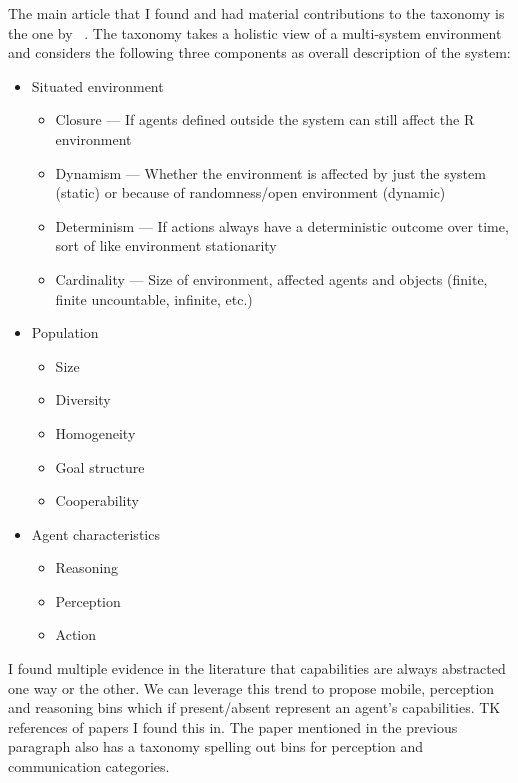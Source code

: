 \documentclass[letterpaper, 10 pt, conference]{ieeeconf} %
\theoremstyle{definition} \newtheorem{definition}{Definition}
\newcommand{\citet}[1]{\citeauthor{#1}~\cite{#1}}
\begin{document}
The main article that I found and had material contributions to the taxonomy is
the one by \citet{moya2007towards}. The taxonomy takes a holistic view of a
multi-system environment and considers the following three components as overall
description of the system:
\begin{itemize}{}
  \item Situated environment
    \begin{itemize}{}
      \item Closure --- If agents defined outside the system can still affect
        the R environment
      \item Dynamism --- Whether the environment is affected by just the system
        (static) or because of randomness/open environment (dynamic)
      \item Determinism --- If actions always have a deterministic outcome over
        time, sort of like environment stationarity
      \item Cardinality --- Size of environment, affected agents and objects
        (finite, finite uncountable, infinite, etc.)
    \end{itemize}
  \item Population
    \begin{itemize}{}
      \item Size
      \item Diversity
      \item Homogeneity
      \item Goal structure
      \item Cooperability
    \end{itemize}
  \item Agent characteristics
    \begin{itemize}{}
      \item Reasoning
      \item Perception
      \item Action
    \end{itemize}
\end{itemize}

I found multiple evidence in the literature that capabilities are always
abstracted one way or the other. We can leverage this trend to propose mobile,
perception and reasoning bins which if present/absent represent an agent's
capabilities. TK\: references of papers I found this in. The paper mentioned in
the previous paragraph also has a taxonomy spelling out bins for perception and
communication categories.
\end{document}
